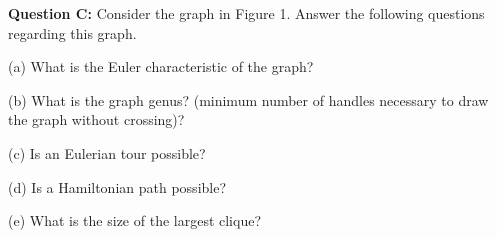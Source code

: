 \documentclass[12pt]{article}
\begin{document}
\bigskip
\noindent
\textbf{Question C:} Consider the graph in Figure 1. Answer the following questions regarding this graph.\smallskip

\smallskip
\noindent
(a) What is the Euler characteristic of the graph?\smallskip

\smallskip
\noindent
(b) What is the graph genus? (minimum number of handles necessary to draw the graph without crossing)?\smallskip

\smallskip
\noindent
(c) Is an Eulerian tour possible?\smallskip

\smallskip
\noindent
(d) Is a Hamiltonian path possible?\smallskip

\smallskip
\noindent
(e) What is the size of the largest clique?
\smallskip
\end{document}
